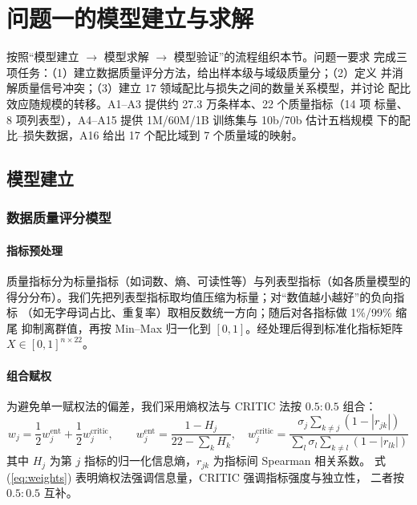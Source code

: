 \section{问题一的模型建立与求解}

按照``模型建立 $\to$ 模型求解 $\to$ 模型验证''的流程组织本节。问题一要求
完成三项任务：（1）建立数据质量评分方法，给出样本级与域级质量分；（2）定义
并消解质量信号冲突；（3）建立 17 领域配比与损失之间的数量关系模型，并讨论
配比效应随规模的转移。A1--A3 提供约 27.3 万条样本、22 个质量指标（14 项
标量、8 项列表型），A4--A15 提供 1M/60M/1B 训练集与 10b/70b 估计五档规模
下的配比--损失数据，A16 给出 17 个配比域到 7 个质量域的映射。

\subsection{模型建立}

\subsubsection{数据质量评分模型}

\paragraph{指标预处理}
质量指标分为标量指标（如词数、熵、可读性等）与列表型指标（如各质量模型的
得分分布）。我们先把列表型指标取均值压缩为标量；对``数值越小越好''的负向指标
（如无字母词占比、重复率）取相反数统一方向；随后对各指标做 1\%/99\% 缩尾
抑制离群值，再按 Min--Max 归一化到 $[0,1]$。经处理后得到标准化指标矩阵
$X\in[0,1]^{n\times 22}$。

\paragraph{组合赋权}

为避免单一赋权法的偏差，我们采用熵权法\cite{refEntropy}与 CRITIC
法\cite{refCritic}按 $0.5:0.5$ 组合：
\begin{equation}
w_j=\frac{1}{2}w_j^{\text{ent}}+\frac{1}{2}w_j^{\text{critic}},\qquad
w_j^{\text{ent}}=\frac{1-H_j}{22-\sum_k H_k},\quad
w_j^{\text{critic}}=\frac{\sigma_j\sum_{k\neq j}(1-|r_{jk}|)}{\sum_l
\sigma_l\sum_{k\neq l}(1-|r_{lk}|)}
\label{eq:weights}
\end{equation}
其中 $H_j$ 为第 $j$ 指标的归一化信息熵，$r_{jk}$ 为指标间 Spearman 相关系数。
式 (\ref{eq:weights}) 表明熵权法强调信息量，CRITIC 强调指标强度与独立性，
二者按 $0.5:0.5$ 互补。

